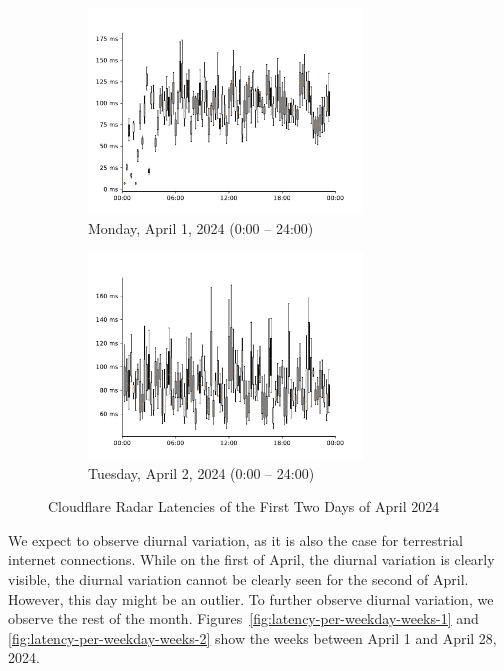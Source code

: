 \begin{figure}
	\centering
	\begin{subfigure}[b]{\textwidth}
		\centering
		\includegraphics[width=0.8\textwidth]{chapters/4-results/latency/img/cf_radar_latencies_2024-04-01_2024-04-02.pdf}
		\caption{Monday, April 1, 2024 (0:00 -- 24:00)}
	\end{subfigure}
	\begin{subfigure}[b]{\textwidth}
		\centering
		\includegraphics[width=0.8\textwidth]{chapters/4-results/latency/img/cf_radar_latencies_2024-04-02_2024-04-03.pdf}
		\caption{Tuesday, April 2, 2024 (0:00 -- 24:00)}
	\end{subfigure}
	\caption{Cloudflare Radar Latencies of the First Two Days of April 2024}
	\label{fig:latency-per-weekday-1st-2nd-april}
\end{figure}

We expect to observe diurnal variation, as it is also the case for terrestrial
internet connections. While on the first of April, the diurnal variation is
clearly visible, the diurnal variation cannot be clearly seen for the second of
April. However, this day might be an outlier. To further observe diurnal
variation, we observe the rest of the month.
Figures~\ref{fig:latency-per-weekday-weeks-1} and
\ref{fig:latency-per-weekday-weeks-2} show the weeks between April 1 and April
28, 2024.


